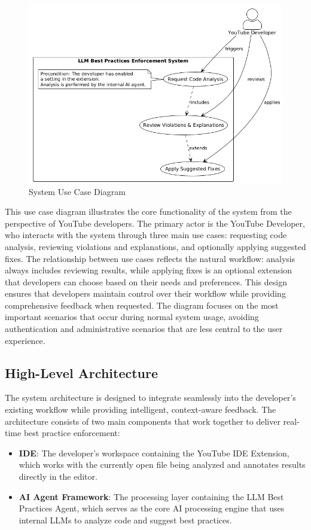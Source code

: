 \begin{spacing}{1.2}
\begin{figure}[H]
\centering
\includegraphics[scale=0.6]{images/use_case_diagram.png}
\caption{System Use Case Diagram}
\label{fig:use_case_diagram}
\end{figure}

This use case diagram illustrates the core functionality of the system from the perspective of YouTube developers. The primary actor is the YouTube Developer, who interacts with the system through three main use cases: requesting code analysis, reviewing violations and explanations, and optionally applying suggested fixes. The relationship between use cases reflects the natural workflow: analysis always includes reviewing results, while applying fixes is an optional extension that developers can choose based on their needs and preferences. This design ensures that developers maintain control over their workflow while providing comprehensive feedback when requested. The diagram focuses on the most important scenarios that occur during normal system usage, avoiding authentication and administrative scenarios that are less central to the user experience.


\subsection{High-Level Architecture}
The system architecture is designed to integrate seamlessly into the developer's existing workflow while providing intelligent, context-aware feedback. The architecture consists of two main components that work together to deliver real-time best practice enforcement:

\begin{itemize}
    \item \textbf{IDE}: The developer's workspace containing the YouTube IDE Extension, which works with the currently open file being analyzed and annotates results directly in the editor.
    \item \textbf{AI Agent Framework}: The processing layer containing the LLM Best Practices Agent, which serves as the core AI processing engine that uses internal LLMs to analyze code and suggest best practices.
\end{itemize}


\end{spacing}
